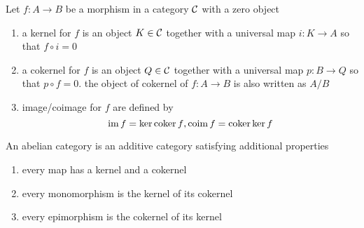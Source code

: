 \begin{definition}
	Let $f: A \to B$ be a morphism in a category $\mathcal{C}$ with a zero object
	\begin{enumerate}
		\item a kernel for $f$ is an object $K \in \mathcal{C}$ together with a universal map $i: K \to A$ so that $f \circ i = 0$
		
		\item a cokernel for $f$ is an object $Q \in \mathcal{C}$ together with a universal map $p: B \to Q$ so that $p \circ f = 0$. the object of cokernel of $f: A \to B$ is also written as $A / B$
		\begin{center}
		\end{center}
		
		\item image/coimage for $f$ are defined by
		$$
		\operatorname{im} f = \ker \operatorname{coker} f \text{,} \operatorname{coim} f = \operatorname{coker} \ker f
		$$
		
	\end{enumerate}
	
\end{definition}

\begin{definition}
	An abelian category is an additive category satisfying additional properties
	\begin{enumerate}
		\item every map has a kernel and a cokernel
		\item every monomorphism is the kernel of its cokernel
		\item every epimorphism is the cokernel of its kernel
	\end{enumerate}
	
	\begin{center}
	\end{center}
\end{definition}

